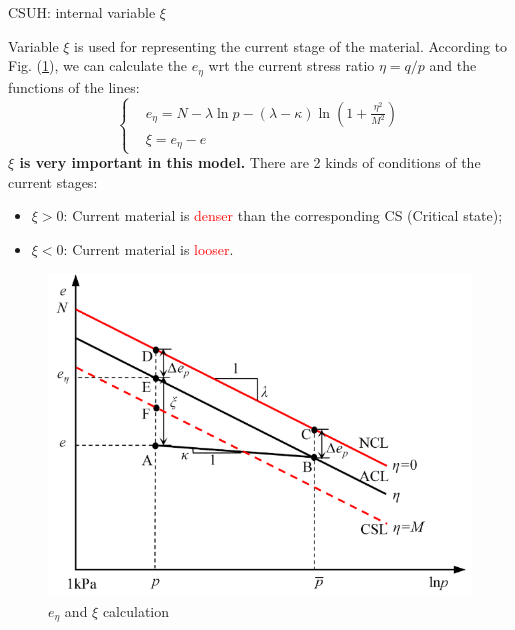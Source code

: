 \documentclass[aspectratio=169]{beamer}
\begin{document}
\begin{frame}{CSUH: internal variable $\xi$}
    \begin{minipage}[c]{0.58\linewidth}
        Variable $\xi$ is used for representing the current stage of the material. According to Fig. (\ref{fig: e_eta calcualtion}), we can calculate the $e_{\eta}$ wrt the current stress ratio $\eta = q/p$ and the functions of the lines:
        \begin{equation}
            \left\{\begin{aligned}
                &e_{\eta}=N-\lambda \ln p-(\lambda-\kappa) \ln \left(1+\frac{\eta^{2}}{M^{2}}\right) \\
                &\xi = e_{\eta}-e
            \end{aligned}\right.
            \label{eq: e_eta calculation}
        \end{equation}
        \textbf{$\xi$ is very important in this model.} There are 2 kinds of conditions of the current stages:
        \begin{itemize}
            \item $\xi > 0$: Current material is \textcolor{red}{denser} than the corresponding CS (Critical state);
            \item $\xi < 0$: Current material is \textcolor{red}{looser}.
        \end{itemize}
    \end{minipage}
    \hspace{2mm}
    \begin{minipage}[c]{0.38\linewidth}
        \begin{figure}
            \centering
            \includegraphics[width=\linewidth]{./pic/e_eta calculation.jpg}
            \caption{$e_{\eta}$ and $\xi$ calculation}
            \label{fig: e_eta calcualtion}
        \end{figure}
    \end{minipage}
\end{frame}
\end{document}
